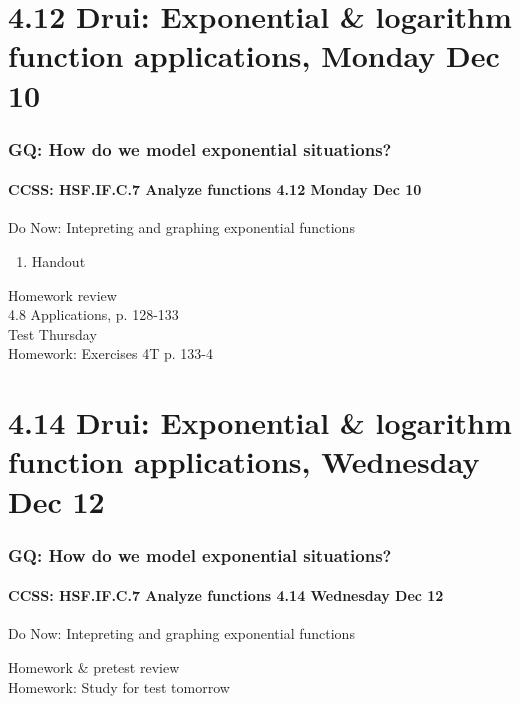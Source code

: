 \documentclass{beamer}
\begin{document}
  \section{4.12 Drui: Exponential \& logarithm function applications, Monday Dec 10}
    \frame
    {
      \frametitle{GQ: How do we model exponential situations?}
      \framesubtitle{CCSS: HSF.IF.C.7 Analyze functions    \alert{4.12 Monday Dec 10}}

      \begin{block}{Do Now: Intepreting and graphing exponential functions}
        \begin{enumerate}
            \item Handout
        \end{enumerate}
      \end{block}
      Homework review \\
      4.8 Applications, p. 128-133\\ \bigskip
      \alert{Test Thursday} \\[0.5cm]
      Homework: Exercises 4T p. 133-4
    }

    \section{4.14 Drui: Exponential \& logarithm function applications, Wednesday Dec 12}
      \frame
      {
        \frametitle{GQ: How do we model exponential situations?}
        \framesubtitle{CCSS: HSF.IF.C.7 Analyze functions    \alert{4.14 Wednesday Dec 12}}

        \begin{block}{Do Now: Intepreting and graphing exponential functions}
          \begin{enumerate}
          \end{enumerate}
        \end{block}
        Homework \& pretest review \\ \bigskip
        Homework: Study for \alert{test tomorrow}
      }
\end{document}
